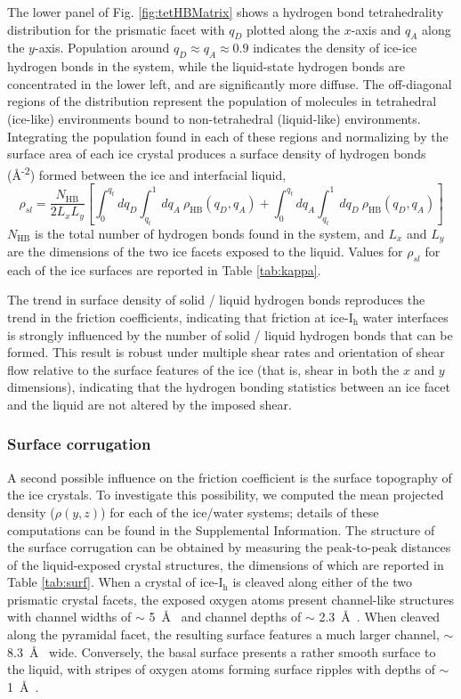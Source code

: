 The lower panel of Fig. \ref{fig:tetHBMatrix} shows a hydrogen bond
tetrahedrality distribution for the prismatic facet with $q_{D}$
plotted along the $x$-axis and $q_{A}$ along the $y$-axis.  Population
around $q_{D} \approx q_{A} \approx 0.9$ indicates the density of
ice-ice hydrogen bonds in the system, while the liquid-state hydrogen
bonds are concentrated in the lower left, and are significantly more
diffuse.  The off-diagonal regions of the distribution represent the
population of molecules in tetrahedral (ice-like) environments bound
to non-tetrahedral (liquid-like) environments. Integrating the
population found in each of these regions and normalizing by the
surface area of each ice crystal produces a surface density of
hydrogen bonds (\AA\textsuperscript{-2}) formed between the ice and
interfacial liquid,
\begin{equation}\label{hbondDensity}
\rho_{sl} = \frac{N_\mathrm{HB}}{2 L_{x}L_{y}} \left[ \int_0^{q_{t}}
  dq_{D} \int_{q_{t}}^1 dq_{A}~\rho_\mathrm{HB}(q_{D},q_{A}) +  \int_0^{q_{t}}
  dq_{A} \int_{q_{t}}^1 dq_{D}~\rho_\mathrm{HB}(q_{D},q_{A}) \right]
\end{equation}
$N_\mathrm{HB}$ is the total number of hydrogen bonds found in the
system, and $L_x$ and $L_y$ are the dimensions of the two ice facets
exposed to the liquid.  Values for $\rho_{sl}$ for each of the ice
surfaces are reported in Table \ref{tab:kappa}.

The trend in surface density of solid / liquid hydrogen bonds
reproduces the trend in the friction coefficients, indicating that
friction at ice-I$_\mathrm{h}$ water interfaces is strongly influenced
by the number of solid / liquid hydrogen bonds that can be formed.
This result is robust under multiple shear rates and orientation of
shear flow relative to the surface features of the ice (that is, shear
in both the $x$ and $y$ dimensions), indicating that the hydrogen
bonding statistics between an ice facet and the liquid are not altered
by the imposed shear.

\subsubsection{Surface corrugation}
A second possible influence on the friction coefficient is the surface
topography of the ice crystals. To investigate this possibility, we
computed the mean projected density ($\rho(y,z)$) for each of the
ice/water systems; details of these computations can be found in the
Supplemental Information. The structure of the surface corrugation can
be obtained by measuring the peak-to-peak distances of the
liquid-exposed crystal structures, the dimensions of which are
reported in Table \ref{tab:surf}. When a crystal of ice-I$_\mathrm{h}$
is cleaved along either of the two prismatic crystal facets, the
exposed oxygen atoms present channel-like structures with channel
widths of $\sim$ 5~\AA~ and channel depths of $\sim$ 2.3~\AA~.  When
cleaved along the pyramidal facet, the resulting surface features a
much larger channel, $\sim$ 8.3~\AA~ wide.  Conversely, the basal
surface presents a rather smooth surface to the liquid, with stripes
of oxygen atoms forming surface ripples with depths of $\sim$ 1~\AA~.

